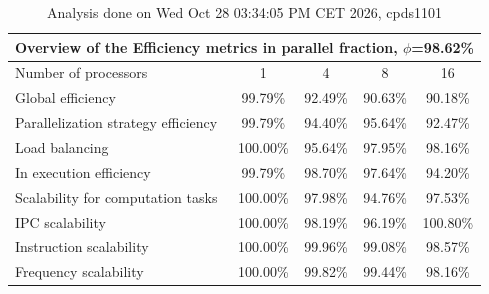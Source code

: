 \begin{table}[h]
\begin{center}
\begin{tabular}{|l|c|c|c|c|}
\hline
\multicolumn{5}{|c|}{Overview of the Efficiency metrics in parallel fraction, $\phi$=98.62\%} \\
\hline
\hline
Number of processors & 1 & 4 & 8 & 16 \\
\hline
\hline
Global efficiency                      &     99.79\% &     92.49\% &     90.63\% &     90.18\% \\
\hline
\hline
Parallelization strategy efficiency &     99.79\% &     94.40\% &     95.64\% &     92.47\% \\
\hline
Load balancing                   &    100.00\% &     95.64\% &     97.95\% &     98.16\% \\
In execution efficiency          &     99.79\% &     98.70\% &     97.64\% &     94.20\% \\
\hline
\hline
Scalability for computation tasks   &    100.00\% &     97.98\% &     94.76\% &     97.53\% \\
\hline
IPC scalability                  &    100.00\% &     98.19\% &     96.19\% &    100.80\% \\
Instruction scalability          &    100.00\% &     99.96\% &     99.08\% &     98.57\% \\
Frequency scalability            &    100.00\% &     99.82\% &     99.44\% &     98.16\% \\
\hline
\end{tabular}
\end{center}
\caption{ Analysis done on Wed Oct 28 03:34:05 PM CET 2026, cpds1101}
\end{table}
